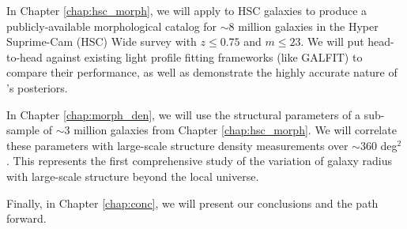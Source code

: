 In Chapter \ref{chap:hsc_morph}, we will apply \gampen{} to HSC galaxies to produce a publicly-available morphological catalog for $\sim 8$ million galaxies in the Hyper Suprime-Cam (HSC) Wide survey with $z \leq 0.75$ and $m \leq 23$. We will put \gampen{} head-to-head against existing light profile fitting frameworks (like GALFIT) to compare their performance, as well as demonstrate the highly accurate nature of \gampen{}'s posteriors.

In Chapter \ref{chap:morph_den}, we will use the structural parameters of a sub-sample of $\sim3$ million galaxies from Chapter \ref{chap:hsc_morph}. We will correlate these parameters with large-scale structure density measurements over $\sim360$ deg$^2$. This represents the first comprehensive study of the variation of galaxy radius with large-scale structure beyond the local universe.

Finally, in Chapter \ref{chap:conc}, we will present our conclusions and the path forward. 